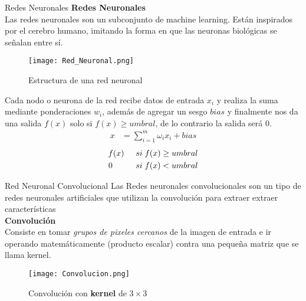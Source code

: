 \begin{frame}{Redes Neuronales}
    \textbf{Redes Neuronales}\\
    Las redes neuronales son un subconjunto de machine learning. Están inspirados por el cerebro humano, imitando la forma en que
    las neuronas biológicas se señalan entre sí.
    \begin{figure}[H]
        \centering
        \texttt{[image: Red\_Neuronal.png]}
        \caption{Estructura de una red neuronal}
        \label{fig:SRCNN_RedNeuronal}
    \end{figure}
\end{frame}

\begin{frame}{}
    Cada nodo o neurona de la red recibe datos de entrada $x_i$ y realiza la suma mediante ponderaciones $w_i$, además de agregar
    un sesgo $bias$ y finalmente nos da una salida $f(x)$ solo si $f(x)\geq umbral$, de lo contrario la salida será $0$.
    \begin{align}
        \label{eqn:SRCNN_RedNeuronal}
                     x&=\sum_{i=1}^{m}\omega_ix_i+bias
    \end{align}
    \begin{equation}
        \begin{split}
            f(x)\hspace{0.5cm}si\hspace{0.1cm}f(x)\geq umbral \\
            0\hspace{1.0cm}si\hspace{0.1cm}f(x) < umbral
        \end{split}
    \end{equation}
\end{frame}

\begin{frame}{Red Neuronal Convolucional}
    Las Redes neuronales convolucionales \cite{RedesConvolucionales} son un tipo de redes neuronales artificiales que utilizan la
    convolución para extraer extraer características\\
    \textbf{Convolución}\\
    Consiste en tomar \emph{grupos de pixeles cercanos} de la imagen de entrada e ir operando
    matemáticamente (producto escalar) contra una pequeña matriz que se llama kernel.
    \begin{figure}[H]
        \label{fig:SRCNN_Convolucion}
        \centering
        \texttt{[image: Convolucion.png]}
        \caption{Convolución con \textbf{kernel} de $3\times 3$}
    \end{figure}
\end{frame}

